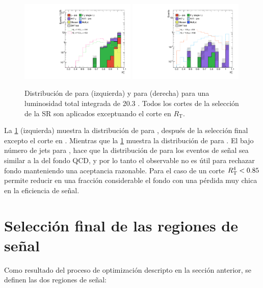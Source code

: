 \begin{figure}[!h]
  \centering

  \includegraphics[width=0.49\textwidth]{figures/rt4_srl}
  \includegraphics[width=0.49\textwidth]{figures/rt2_srh}

  \caption{Distribución de {\rt} para {\SRL}  (izquierda) y {\rtt} para {\SRH} (derecha)
    para una luminosidad total integrada de 20.3 \ifb. Todos los cortes de la selección
    de la SR son aplicados exceptuando el corte en $R_\mathrm{T}$.}
  \label{fig:opt_rt}
\end{figure}

La \cref{fig:opt_rt} (izquierda) muestra la distribución de {\rtt} para {\SRH},
después de la selección final excepto el corte en {\rtt}. Mientras que la
\cref{fig:opt_rt} muestra la distribución de {\rt} para {\SRL}. El bajo número
de jets para {\SRH}, hace que la distribución de {\rtt} para los eventos de
señal sea similar a la del fondo QCD, y por lo tanto el observable no es útil
para rechazar fondo manteniendo una aceptancia razonable. Para el caso de {\SRL}
un corte $R_{\mathrm{T}}^{4} < 0.85$ permite reducir en una fracción considerable el fondo con
una pérdida muy chica en la eficiencia de señal.



\section{Selección final de las regiones de se\~nal}\label{sec:signal_regions}

Como resultado del proceso de optimización descripto en la sección anterior,
se definen las dos regiones de señal:

